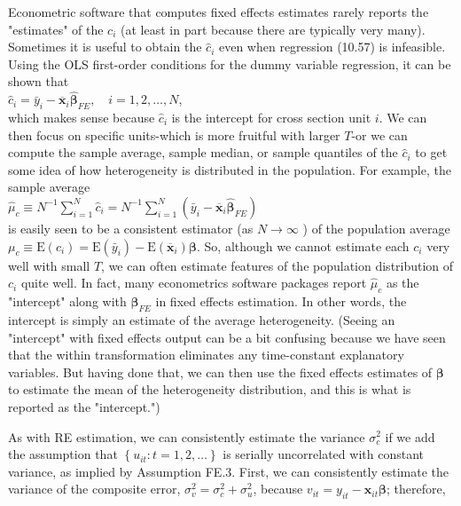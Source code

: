 \documentclass[10pt]{article}
\begin{document}
Econometric software that computes fixed effects estimates rarely reports the "estimates" of the $c_{i}$ (at least in part because there are typically very many). Sometimes it is useful to obtain the $\hat{c}_{i}$ even when regression (10.57) is infeasible. Using the OLS first-order conditions for the dummy variable regression, it can be shown that\\
$\hat{c}_{i}=\bar{y}_{i}-\overline{\mathbf{x}}_{i} \hat{\boldsymbol{\beta}}_{F E}, \quad i=1,2, \ldots, N$,\\
which makes sense because $\hat{c}_{i}$ is the intercept for cross section unit $i$. We can then focus on specific units-which is more fruitful with larger $T$-or we can compute the sample average, sample median, or sample quantiles of the $\hat{c}_{i}$ to get some idea of how heterogeneity is distributed in the population. For example, the sample average\\
$\hat{\mu}_{c} \equiv N^{-1} \sum_{i=1}^{N} \hat{c}_{i}=N^{-1} \sum_{i=1}^{N}\left(\bar{y}_{i}-\overline{\mathbf{x}}_{i} \hat{\boldsymbol{\beta}}_{F E}\right)$\\
is easily seen to be a consistent estimator (as $N \rightarrow \infty$ ) of the population average $\mu_{c} \equiv \mathrm{E}\left(c_{i}\right)=\mathrm{E}\left(\bar{y}_{i}\right)-\mathrm{E}\left(\overline{\mathbf{x}}_{i}\right) \boldsymbol{\beta}$. So, although we cannot estimate each $c_{i}$ very well with small $T$, we can often estimate features of the population distribution of $c_{i}$ quite well. In fact, many econometrics software packages report $\hat{\mu}_{c}$ as the "intercept" along with $\hat{\boldsymbol{\beta}}_{F E}$ in fixed effects estimation. In other words, the intercept is simply an estimate of the average heterogeneity. (Seeing an "intercept" with fixed effects output can be a bit confusing because we have seen that the within transformation eliminates any time-constant explanatory variables. But having done that, we can then use the fixed effects estimates of $\boldsymbol{\beta}$ to estimate the mean of the heterogeneity distribution, and this is what is reported as the "intercept.")

As with RE estimation, we can consistently estimate the variance $\sigma_{c}^{2}$ if we add the assumption that $\left\{u_{i t}: t=1,2, \ldots\right\}$ is serially uncorrelated with constant variance, as implied by Assumption FE.3. First, we can consistently estimate the variance of the composite error, $\sigma_{v}^{2}=\sigma_{c}^{2}+\sigma_{u}^{2}$, because $v_{i t}=y_{i t}-\mathbf{x}_{i t} \boldsymbol{\beta}$; therefore,
\end{document}
